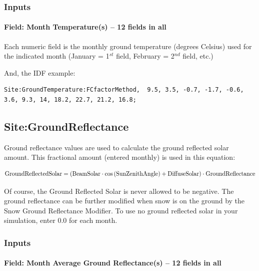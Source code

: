 \subsubsection{Inputs}\label{inputs-18-004}

\paragraph{Field: Month Temperature(s) -- 12 fields in all}\label{field-month-temperatures-12-fields-in-all-3}

Each numeric field is the monthly ground temperature (degrees Celsius) used for the indicated month (January = 1\(^{st}\) field, February = 2\(^{nd}\) field, etc.)

And, the IDF example:

\begin{lstlisting}
Site:GroundTemperature:FCfactorMethod,  9.5, 3.5, -0.7, -1.7, -0.6, 3.6, 9.3, 14, 18.2, 22.7, 21.2, 16.8;
\end{lstlisting}

\subsection{Site:GroundReflectance}\label{sitegroundreflectance}

Ground reflectance values are used to calculate the ground reflected solar amount. This fractional amount (entered monthly) is used in this equation:

\begin{equation}
\rm{GroundReflectedSolar} = \left( \rm{BeamSolar} \cdot cos \left( \rm{SunZenithAngle} \right) + \rm{DiffuseSolar} \right) \cdot \rm{GroundReflectance}
\end{equation}

Of course, the Ground Reflected Solar is never allowed to be negative. The ground reflectance can be further modified when snow is on the ground by the Snow Ground Reflectance Modifier. To use no ground reflected solar in your simulation, enter 0.0 for each month.

\subsubsection{Inputs}\label{inputs-19-003}

\paragraph{Field: Month Average Ground Reflectance(s) -- 12 fields in all}\label{field-month-average-ground-reflectances-12-fields-in-all}

